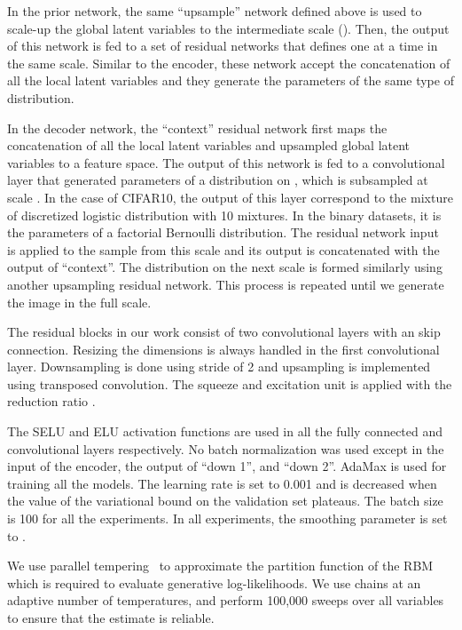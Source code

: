 \documentclass{article}
\begin{document}
In the prior network, the same ``upsample'' network defined above is used to scale-up the global latent variables to the intermediate scale (). 
Then, the output of this network is fed to a set of residual networks that defines  one at a time in the same scale. 
Similar to the encoder, these network accept the concatenation of all the local latent variables and they generate the parameters of the same type of distribution.

In the decoder network, the ``context'' residual network first maps the concatenation of all the local latent variables and upsampled global latent variables to
a feature space. The output of this network is fed to a convolutional layer that generated parameters of a distribution on , which is subsampled 
 at scale . In the case of CIFAR10, the output of this layer correspond to the mixture of discretized logistic distribution \cite{salimans2017pixelcnn++} with 
10 mixtures. In the binary datasets, it is the parameters of a factorial Bernoulli distribution. The residual network input~ is applied to the
sample from this scale and its output is concatenated with the output of ``context''. The distribution on the next scale is formed similarly using another upsampling residual network. 
This process is repeated until we generate the image in the full scale. 

The residual blocks in our work consist of two convolutional layers with an skip connection. Resizing the dimensions is always handled in the first convolutional layer.
Downsampling is done using stride of 2 and upsampling is implemented using transposed convolution. The squeeze and excitation unit is applied with the reduction ratio  \cite{hu2017squeeze}.

The SELU \cite{klambauer2017self} and ELU \cite{clevert2015fast} activation functions are used in all the fully connected and convolutional layers respectively. 
No batch normalization was used except in the input of the encoder, the output of ``down 1'', and ``down 2''. AdaMax \cite{kingma2014adam} is used for training all the models. The learning rate
is set to 0.001 and is decreased when the value of the variational bound on the validation set plateaus. The batch size is 100 for all the experiments. In all experiments, the  smoothing parameter is set to .

We use parallel tempering~\cite{hukushima1996exchange, iba2001extended} to approximate the partition function of the RBM which is required
to evaluate generative log-likelihoods. We use chains at an adaptive number of temperatures, and perform 100,000 sweeps over all variables to ensure that the  estimate is reliable.
\end{document}

